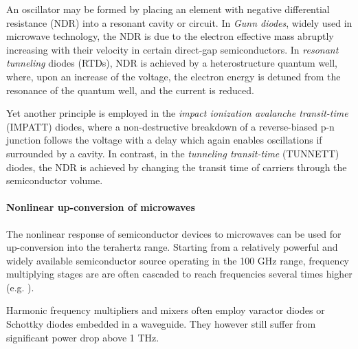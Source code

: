 An oscillator may be formed by placing an element with negative differential resistance (NDR) into a resonant cavity or circuit. 
In \textit{Gunn diodes}, widely used in microwave technology, the NDR is due to the electron effective mass abruptly increasing with their velocity in certain direct-gap semiconductors.
In \textit{resonant tunneling} diodes (RTDs)\cite{asada2008resonant,brown1991oscillations}, NDR is achieved by a heterostructure quantum well, where, upon an increase of the voltage, the electron energy is detuned from the resonance of the quantum well, and the current is reduced.

Yet another principle is employed in the \textit{impact ionization avalanche transit-time} (IMPATT) diodes, where a non-destructive breakdown of a reverse-biased p-n junction follows the voltage with a delay which again enables oscillations if surrounded by a cavity. 
In contrast, in the \textit{tunneling transit-time} (TUNNETT) diodes, the NDR is achieved by changing the transit time of carriers through the semiconductor volume.
\paragraph{Nonlinear up-conversion of microwaves}%
The nonlinear response of semiconductor devices to microwaves can be used for up-conversion into the terahertz range. Starting from a relatively powerful and widely available semiconductor source operating in the 100 GHz range, frequency multiplying stages are are often cascaded to reach frequencies several times higher (e.g. \cite{thomas2012first}). 

Harmonic frequency multipliers and mixers often employ varactor diodes or Schottky diodes embedded in a waveguide. They however still suffer from significant power drop above 1 THz.


